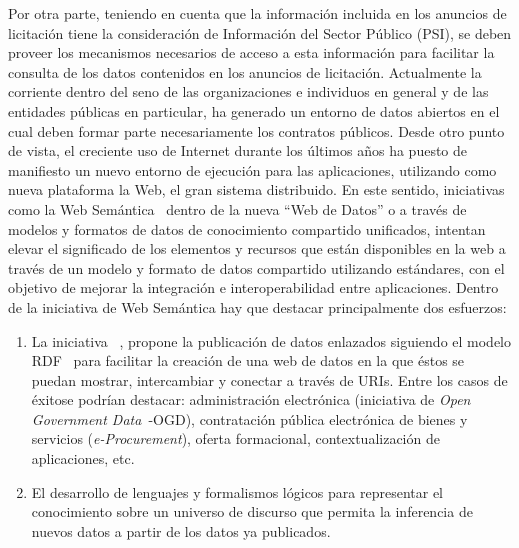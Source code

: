 \documentclass[a4paper,final,11pt,fleqn,twoside]{book}  %
\begin{document}
Por otra parte, teniendo en cuenta que la información incluida en los anuncios de licitación
tiene la consideración de Información del Sector Público (PSI), se deben proveer los mecanismos
necesarios de acceso a esta información para facilitar la consulta de los datos contenidos
en los anuncios de licitación. Actualmente la corriente \opendata dentro del seno de las organizaciones e individuos en general y de las entidades públicas en particular, ha generado un entorno
de datos abiertos en el cual deben formar parte necesariamente los contratos públicos. Desde otro punto de vista, el creciente uso de Internet durante los últimos años ha puesto de manifiesto un
nuevo entorno de ejecución para las aplicaciones, utilizando como nueva plataforma la Web, el gran sistema distribuido. En este sentido, iniciativas como la Web Semántica~\cite{Berners-Lee2001} dentro de la nueva ``Web de Datos'' o \wode a través de modelos y
formatos de datos de conocimiento compartido unificados, intentan elevar el
significado de los elementos y recursos que están disponibles en la web a través de un modelo y formato de datos 
compartido utilizando estándares, con el objetivo de mejorar la integración e interoperabilidad entre aplicaciones. 
Dentro de la iniciativa de Web Semántica hay que destacar principalmente dos esfuerzos: 
\begin{enumerate}
 \item La iniciativa \linkeddata~\cite{Berners-Lee-2006}, propone la publicación de datos
enlazados siguiendo el modelo RDF~\cite{rdf-syntax} para facilitar la creación de una web de
datos en la que éstos se puedan mostrar, intercambiar y conectar a través de
URIs. Entre los casos de éxitose podrían destacar: administración electrónica (iniciativa de \textit{Open Government
Data}~\cite{8-principles}-OGD), contratación pública electrónica de bienes y servicios (\textit{e-Procurement}), oferta
formacional, contextualización de aplicaciones, etc. 

\item El desarrollo de lenguajes y formalismos lógicos para representar el
conocimiento sobre un universo de discurso que permita la inferencia de nuevos
datos a partir de los datos ya publicados.
\end{enumerate}
\end{document}

